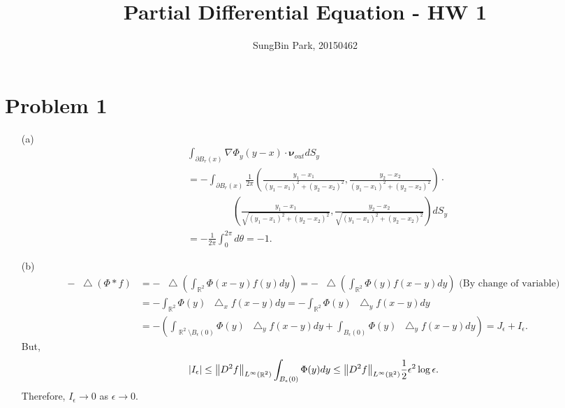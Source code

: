 \documentclass{article}
\DeclareMathOperator{\rr}{\mathbb{R}}
\newcommand*\Laplace{\mathop{}\!\mathbin\bigtriangleup}
\begin{document}
\title{Partial Differential Equation - HW 1}
\author{SungBin Park, 20150462} 

 \maketitle

\section*{Problem 1}
\begin{enumerate}
\item[(a)] \begin{equation*}
\begin{split}
&\int_{\partial B_r(x)}\nabla \Phi_y (y-x)\cdot \bm{\nu}_{out}dS_y\\
&=-\int_{\partial B_r(x)}\frac{1}{2\pi}\left(\frac{y_1-x_1}{(y_1-x_1)^2+(y_2-x_2)^2}, \frac{y_2-x_2}{(y_1-x_1)^2+(y_2-x_2)^2}\right)\cdot\\
&~~~~~~~~~~~~~~~~~~~~~\left(\frac{y_1-x_1}{\sqrt{(y_1-x_1)^2+(y_2-x_2)^2}}, \frac{y_2-x_2}{\sqrt{(y_1-x_1)^2+(y_2-x_2)^2}}\right)dS_y\\
&=-\frac{1}{2\pi}\int_0^{2\pi}d\theta=-1.
\end{split}
\end{equation*}
\item[(b)]
\begin{equation*}
\begin{split}
-\Laplace(\Phi*f)&=-\Laplace\left(\int_{\rr^2}\Phi(x-y)f(y)dy\right)=-\Laplace\left(\int_{\rr^2}\Phi(y)f(x-y)dy\right) \text{ (By change of variable)}\\
&=-\int_{\rr^2}\Phi(y)\Laplace_x f(x-y)dy=-\int_{\rr^2}\Phi(y)\Laplace_y f(x-y)dy\\
&=-\left(\int_{\rr^2 \setminus B_\epsilon(0)}\Phi(y)\Laplace_y f(x-y)dy+\int_{B_\epsilon(0)}\Phi(y)\Laplace_y f(x-y)dy\right)=J_\epsilon+I_\epsilon.
\end{split}
\end{equation*}
But,
\begin{equation*}
\abs{I_\epsilon}\leq \norm{D^2 f}_{L^\infty(\rr^2)}\int_{B_\epsilon(0)}\Phi(y)dy\leq\norm{D^2 f}_{L^\infty(\rr^2)}\frac{1}{2}\epsilon^2\log{\epsilon}.
\end{equation*}
Therefore, $I_\epsilon\rightarrow 0$ as $\epsilon\rightarrow 0$.


\end{enumerate}
\end{document}

